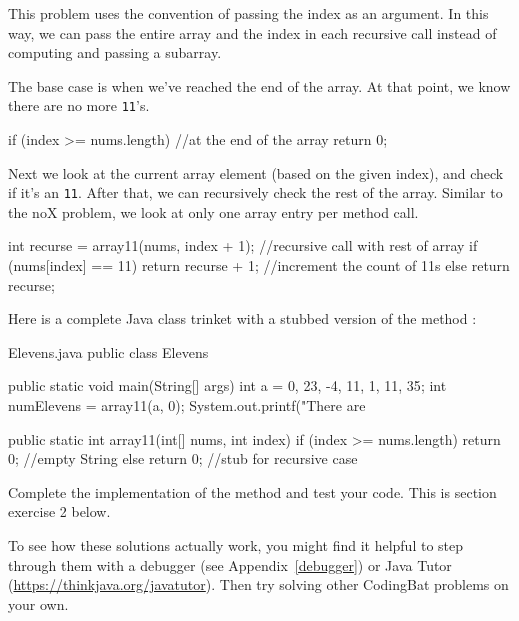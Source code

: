 This problem uses the convention of passing the index as an argument.  In this way, we can pass the entire array and the index in each recursive call instead of computing and passing a subarray. 

The base case is when we've reached the end of the array.  At that point, we know there are no more {\tt 11}'s.

\begin{code}
if (index >= nums.length) {  //at the end of the array
    return 0;
}
\end{code}

Next we look at the current array element (based on the given index), and check if it's an {\tt 11}.
After that, we can recursively check the rest of the array.
Similar to the noX problem, we look at only one array entry per method call.

\begin{code}
int recurse = array11(nums, index + 1);  //recursive call with rest of array
if (nums[index] == 11) {
    return recurse + 1;  //increment the count of 11s
} else {
    return recurse;
}
\end{code}

Here is a complete Java class trinket with a stubbed version of the method :

\begin{trinket} [290] {Elevens.java}
public class Elevens {

    public static void main(String[] args) {
       int a = {0, 23, -4, 11, 1, 11, 35};  
       int numElevens = array11(a, 0);    
       System.out.printf("There are %
    }
    
    public static int array11(int[] nums, int index) {
        if (index >= nums.length) {
           return 0; //empty String
        } else {
           return 0; //stub for recursive case
        }
    }
}
\end{trinket}

Complete the implementation of the  method and test your code.  This is section exercise 2 below.


To see how these solutions actually work, you might find it helpful to step through them with a debugger (see Appendix~\ref{debugger}) or Java Tutor (\url{https://thinkjava.org/javatutor}).
Then try solving other CodingBat problems on your own.

